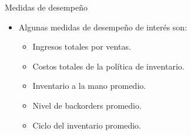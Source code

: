 \begin{frame}{Medidas de desempeño}
    \begin{itemize}
        \item Algunas medidas de desempeño de interés son:
        \begin{itemize}
            \item Ingresos totales por ventas.
            \item Costos totales de la política de inventario.
            \item Inventario a la mano promedio.
            \item Nivel de backorders promedio.
            \item Ciclo del inventario promedio.
        \end{itemize}
    \end{itemize}
\end{frame}
